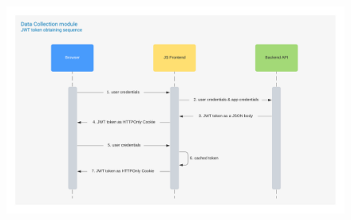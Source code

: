 \begin{figure}[!hbt]
    
    \centering
    \includegraphics[width=\linewidth]{resources/jwt_sequence_diagram.png}
    \captionsetup{width=\linewidth}
    \label{fig:jwt-sequence}
\end{figure}